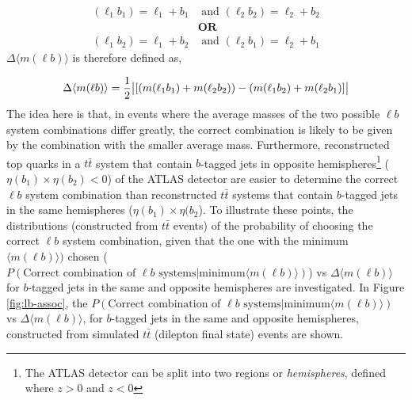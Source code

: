 \begin{align}
    (\ell_{1} b_{1}) = \ell_{1} + b_{1} &\text{ and }  (\ell_{2} b_{2})  = \ell_{2} + b_{2} \\
    &\textbf{OR}\nonumber\\ 
     (\ell_{1} b_{2}) = \ell_{1} + b_{2} &\text{ and }  (\ell_{2} b_{1})  = \ell_{2} + b_{1} 
\end{align}$\Delta \langle m(\ell b) \rangle$ is therefore defined as,

\begin{equation}
    \Delta \langle m(\ell b) \rangle = \frac{1}{2} \abs{[( m(\ell_{1} b_{1}) + m(\ell_{2} b_{2}) ) - ( m(\ell_{1} b_{2}) + m(\ell_{2} b_{1}) ]}
\end{equation}The idea here is that, in events where the average masses of the two possible $\ell b$ system combinations differ greatly, the correct combination is likely to be given by the combination with the smaller average mass. Furthermore, reconstructed top quarks in a $t\bar{t}$ system that contain $b$-tagged jets in opposite hemispheres\footnote{The ATLAS detector can be split into two regions or \textit{hemispheres}, defined where $z > 0$ and $z < 0$} ($\eta(b_{1}) \times \eta(b_{2}) < 0$) of the ATLAS detector are easier to determine the correct $\ell b$ system combination than reconstructed $t\bar{t}$ systems that contain $b$-tagged jets in the same hemispheres ($\eta(b_{1}) \times \eta(b_{2}$). To illustrate these points, the distributions (constructed from $t\bar{t}$ events) of the probability of choosing the correct $\ell b$ system combination, given that the one with the minimum $\langle m(\ell b) \rangle)$ chosen ($P(\text{Correct combination of } \ell b \text{ systems} | \text{minimum} \langle m(\ell b) \rangle)$) vs $\Delta \langle m(\ell b) \rangle$ for $b$-tagged jets in the same and opposite hemispheres are investigated. In Figure \ref{fig:lb-assoc}, the $P(\text{Correct combination of } \ell b \text{ systems} | \text{minimum} \langle m(\ell b) \rangle)$ vs $\Delta \langle m(\ell b) \rangle$, for $b$-tagged jets in the same and opposite hemispheres, constructed from simulated $t\bar{t}$ (dilepton final state) events are shown.
